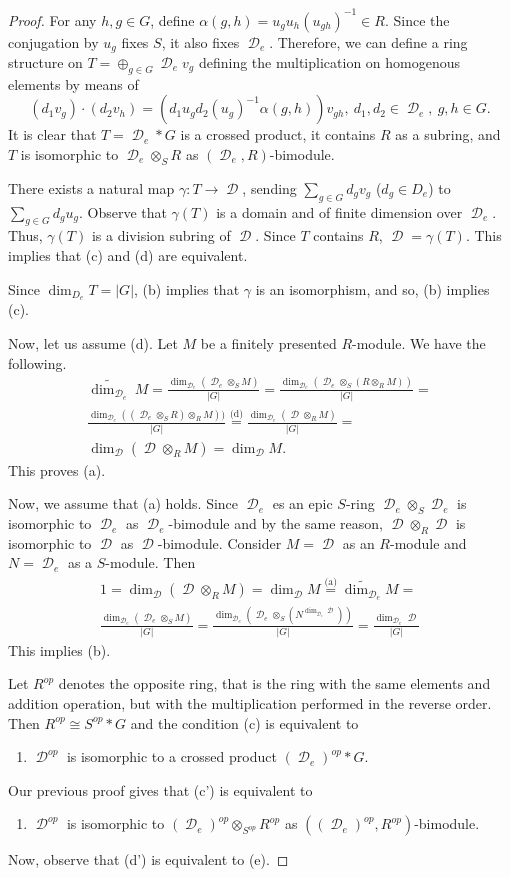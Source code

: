 \documentclass[10pt,a4paper]{amsart}
\DeclareMathOperator{\D}{\mathcal D}
\newcommand{\myeq}[1]{\ensuremath{\stackrel{\text{#1}}{=}}}
\begin{document}
\begin{proof} For any $h,g\in G$, define $\alpha(g,h)=u_gu_h(u_{gh})^{-1}\in R$. Since the conjugation by $u_g$ fixes $S$, it also fixes $\D_e$. Therefore, we can define a ring structure on $T=\oplus_{g\in G}\D_ev_g$ defining the multiplication on homogenous elements by means of
$$ (d_1v_g)\cdot (d_2v_h)=(d_1u_gd_2(u_g)^{-1}\alpha(g,h))v_{gh}, \ d_1,d_2\in \D_e, \ g,h\in G.$$
It is clear that $T=\D_e*G$ is a crossed product, it contains  $R$ as a subring, and $T$ is isomorphic to $\D_e\otimes_ S R$ as $(\D_e , R)$-bimodule.

There exists a natural map $\gamma: T\to \D$, sending $\sum_{g\in G} d_gv_g$ ($d_g\in D_e$) to $\sum_{g\in G} d_gu_g$. Observe that $\gamma(T)$ is a domain and of finite dimension over $\D_e$. Thus, $\gamma(T)$ is a division subring of $\D$. Since $T$ contains $R$, $\D=\gamma(T)$.  This implies that (c) and (d) are equivalent. 

Since $\dim_{D_e} T=|G|$,  (b) implies that $\gamma$ is an isomorphism, and so, (b) implies (c).

Now, let us assume (d). Let $M$ be a finitely presented  $R$-module. We have the following.
\begin{multline*}
\widetilde{\dim_{\D_e}}\ M= \frac{  \dim_{\D_e}(\D_e\otimes _S M)}{|G|}=
\frac{\dim_{\D_e}(\D_e\otimes_S(R\otimes _R M))}{|G|}=\\
\frac{\dim_{\D_e}((\D_e\otimes_SR)\otimes _R M))}{|G|}\myeq{(d)}
\frac{\dim_{\D_e}(\D\otimes_R M)}{|G|}=\\ \dim_{\D} (\D\otimes_R M)=\dim_{\D} M.\end{multline*}
This proves (a).

Now, we assume that (a) holds. Since $\D_e$ es an epic $S$-ring $\D_e\otimes_S \D_e$ is isomorphic to $\D_e$ as $\D_e$-bimodule and by the same reason, $\D \otimes_R \D $ is isomorphic to $\D $ as $\D $-bimodule. Consider $M=\D$ as an $R$-module and $N=\D_e$ as a $S$-module. Then 
\begin{multline*}1=\dim_{\D}(\D\otimes_R M)=\dim_{\D} M\myeq{(a)}\widetilde{\dim_{\D_e}} M=\\
\frac{\dim_{\D_e}(\D_e\otimes_S M)}{|G|}=\frac{\dim_{\D_e}(\D_e\otimes_S(N^{\dim_{\D_e} \D}))}{|G|}=\frac{\dim_{\D_e} \D}{|G|}
\end{multline*}
This implies (b).


Let $R^{op}$ denotes the opposite ring, that is the ring with the same elements and addition operation, but with the multiplication performed in the reverse order. Then $R^{op}\cong S^{op}*G$ and the condition (c) is equivalent to
\begin{enumerate}
 \item[(c')] $\D^{op}$ is isomorphic to a crossed product $(\D_e)^{op}*G$.
 \end{enumerate}
Our previous proof gives that (c') is equivalent to  
\begin{enumerate}
 \item[(d')] $\D^{op}$ is isomorphic to $(\D_e)^{op}\otimes_ {S^{op}}R^{op}$ as $((\D_e)^{op} , R^{op})$-bimodule.
  \end{enumerate}
Now, observe  that (d') is equivalent to (e).
\end{proof}
\end{document}
